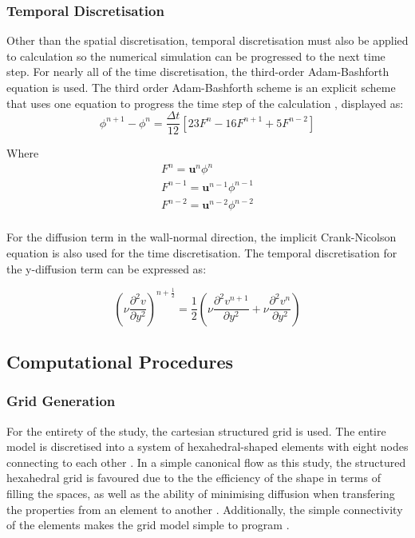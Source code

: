 \subsubsection{Temporal Discretisation}
\label{sec:temp_disc}
Other than the spatial discretisation, temporal discretisation must also be applied to calculation so the numerical simulation can be progressed to the next time step. For nearly all of the time discretisation, the third-order Adam-Bashforth equation is used. The third order Adam-Bashforth scheme is an explicit scheme that uses one equation to progress the time step of the calculation \cite{Durran1991}, displayed as:
\begin{equation}
	\phi^{n+1} - \phi^{n} = \frac{\Delta t}{12} [23F^{n} - 16F^{n+1}+5F^{n-2}]
\end{equation}

Where
\begin{equation*}
	\begin{gathered}
		F^n = \mathbf{u}^n \phi^n\\
		F^{n-1} = \mathbf{u}^{n-1} \phi^{n-1}\\
		F^{n-2} = \mathbf{u}^{n-2} \phi^{n-2}\\
		\label{eq:Fhalf}
	\end{gathered}
\end{equation*}

For the diffusion term in the wall-normal direction, the implicit Crank-Nicolson equation is also used for the time discretisation. The temporal discretisation for the y-diffusion term can be expressed as:

\begin{equation}
	\left( \nu \frac{\partial^2 v}{\partial y^2} \right)^{n+\frac{1}{2}} = \frac{1}{2} \left( \nu \frac{\partial^2 v^{n+1}}{\partial y^2} + \nu \frac{\partial^2 v^n}{\partial y^2} \right)
\end{equation}



\subsection{Computational Procedures}
\label{sec:Computational procedures}
 

\subsubsection{Grid Generation}
\label{sec:Gridgen}
For the entirety of the study, the cartesian structured grid is used. The entire model is discretised into a system of hexahedral-shaped elements with eight nodes connecting to each other \cite{Yeoh2010}. In a simple canonical flow as this study, the structured hexahedral grid is favoured due to the the efficiency of the shape in terms of filling the spaces, as well as the ability of minimising diffusion when transfering the properties from an element to another \cite{ANSYS2020}. Additionally, the simple connectivity of the elements makes the grid model simple to program \cite{TU2018125}.

